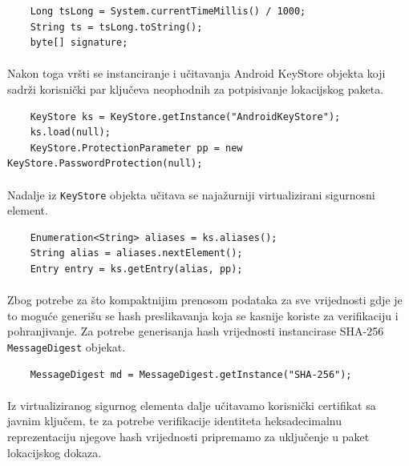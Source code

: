 \begin{verbatim}
    Long tsLong = System.currentTimeMillis() / 1000;
    String ts = tsLong.toString();
    byte[] signature;
\end{verbatim}

\paragraph*{}
Nakon toga vršti se instanciranje i učitavanja Android KeyStore objekta koji sadrži korisnički par ključeva neophodnih za potpisivanje lokacijskog paketa.

\begin{verbatim}
    KeyStore ks = KeyStore.getInstance("AndroidKeyStore");
    ks.load(null);
    KeyStore.ProtectionParameter pp = new KeyStore.PasswordProtection(null);
\end{verbatim}

\paragraph*{}
Nadalje iz \texttt{KeyStore} objekta učitava se najažurniji virtualizirani sigurnosni element.

\begin{verbatim}
    Enumeration<String> aliases = ks.aliases();
    String alias = aliases.nextElement();
    Entry entry = ks.getEntry(alias, pp);
\end{verbatim}

\paragraph*{}
Zbog potrebe za što kompaktnijim prenosom podataka za sve vrijednosti gdje je to moguće generišu se hash preslikavanja koja se kasnije koriste za verifikaciju i pohranjivanje. Za potrebe generisanja hash vrijednosti instancirase SHA-256 \texttt{MessageDigest} objekat.

\begin{verbatim}
    MessageDigest md = MessageDigest.getInstance("SHA-256");
\end{verbatim}

\paragraph*{}
Iz virtualiziranog sigurnog elementa dalje učitavamo korisnički certifikat sa javnim ključem, te za potrebe verifikacije identiteta heksadecimalnu reprezentaciju njegove hash vrijednosti pripremamo za uključenje u paket lokacijskog dokaza.

